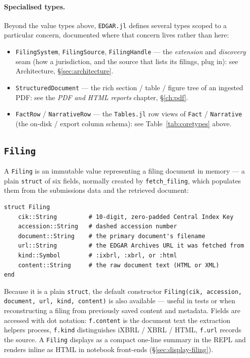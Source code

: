 \documentclass[11pt,a4paper]{report}
\begin{document}
\paragraph{Specialised types.} Beyond the value types above, \texttt{EDGAR.jl} defines several types scoped
to a particular concern, documented where that concern lives rather than here:
\begin{itemize}[nosep]
  \item \texttt{FilingSystem}, \texttt{FilingSource}, \texttt{FilingHandle} --- the \emph{extension} and
    \emph{discovery} seam (how a jurisdiction, and the source that lists its filings, plug in): see
    Architecture, \S\ref{sec:architecture}.
  \item \texttt{StructuredDocument} --- the rich section / table / figure tree of an ingested PDF: see the
    \emph{PDF and HTML reports} chapter, \S\ref{ch:pdf}.
  \item \texttt{FactRow} / \texttt{NarrativeRow} --- the \texttt{Tables.jl} row views of \texttt{Fact} /
    \texttt{Narrative} (the on-disk / export column schema): see Table~\ref{tab:coretypes} above.
\end{itemize}

\subsection{\texttt{Filing}}
\label{sec:filing-type}

\noindent A \texttt{Filing} is an immutable value representing a filing document in memory --- a plain
\texttt{struct} of six fields, normally created by \texttt{fetch\_filing}, which populates them from the
submissions data and the retrieved document:

\begin{lstlisting}
struct Filing
    cik::String         # 10-digit, zero-padded Central Index Key
    accession::String   # dashed accession number
    document::String    # the primary document's filename
    url::String         # the EDGAR Archives URL it was fetched from
    kind::Symbol        # :ixbrl, :xbrl, or :html
    content::String     # the raw document text (HTML or XML)
end
\end{lstlisting}

\noindent Because it is a plain \texttt{struct}, the default constructor
\texttt{Filing(cik, accession, document, url, kind, content)} is also available --- useful in tests or when
reconstructing a filing from previously saved content and metadata. Fields are accessed with dot notation:
\texttt{f.content} is the document text the extraction helpers process, \texttt{f.kind} distinguishes iXBRL /
XBRL / HTML, \texttt{f.url} records the source. A \texttt{Filing} displays as a compact one-line summary in
the REPL and renders inline as HTML in notebook front-ends (\S\ref{sec:display-filing}).
\end{document}
